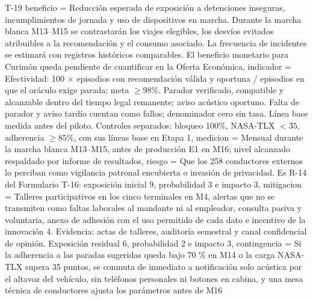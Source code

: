 \begin{formulario}{T-19}
{  beneficio = {Reducción esperada de exposición a detenciones inseguras, incumplimientos de jornada y uso de dispositivos en marcha. Durante la marcha blanca M13--M15 se contrastarán los viajes elegibles, los desvíos evitados atribuibles a la recomendación y el consumo asociado. La frecuencia de incidentes se estimará con registros históricos comparables. El beneficio monetario para Curimón queda pendiente de cuantificar en la Oferta Económica},
  indicador = {Efectividad: 100 × episodios con recomendación válida y oportuna / episodios en que el oráculo exige parada; meta $\ge98\%$. Parador verificado, compatible y alcanzable dentro del tiempo legal remanente; aviso acústico oportuno. Falta de parador y aviso tardío cuentan como fallos; denominador cero sin tasa. Línea base medida antes del piloto. Controles separados: bloqueo 100\%, NASA-TLX $<35$, adherencia $\ge85\%$, con sus líneas base en Etapa 1},
  medicion = {Mensual durante la marcha blanca M13--M15, antes de producción E1 en M16; nivel alcanzado respaldado por informe de resultados},
  riesgo = {Que los 258 conductores externos lo perciban como vigilancia patronal encubierta o invasión de privacidad. Es R-14 del Formulario T-16: exposición inicial 9, probabilidad 3 e impacto 3},
  mitigacion = {Talleres participativos en los cinco terminales en M4, alertas que no se transmiten como faltas laborales al mandante ni al empleador, consulta pasiva y voluntaria, anexo de adhesión con el uso permitido de cada dato e incentivo de la innovación 4. Evidencia: actas de talleres, auditoría semestral y canal confidencial de opinión. Exposición residual 6, probabilidad 2 e impacto 3},
  contingencia = {Si la adherencia a las paradas sugeridas queda bajo 70 \% en M14 o la carga NASA-TLX supera 35 puntos, se conmuta de inmediato a notificación solo acústica por el altavoz del vehículo, sin teléfonos personales ni botones en cabina, y una mesa técnica de conductores ajusta los parámetros antes de M16}
}
\end{formulario}

